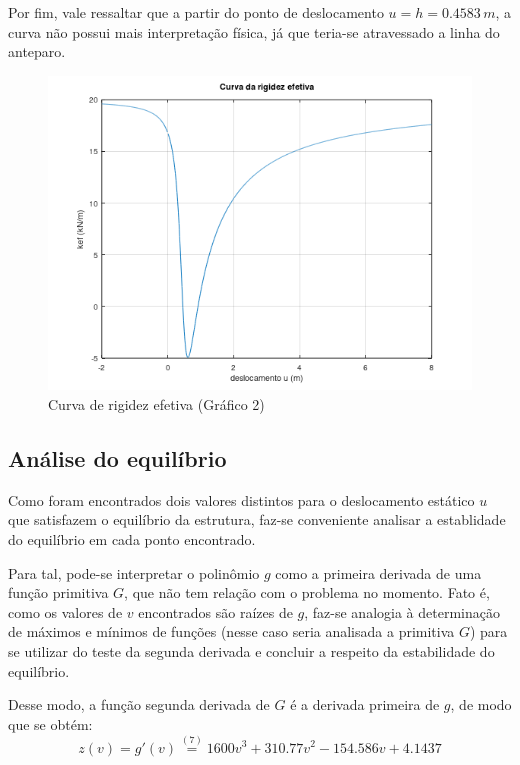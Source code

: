 \documentclass[a4paper, 12pt]{article}
\begin{document}
	Por fim, vale ressaltar que a partir do ponto de deslocamento $u=h=0.4583\,m$, a curva não possui mais interpretação
	física, já que teria-se atravessado a linha do anteparo.
	
	\begin{figure}[!htb]
		\centering
		\includegraphics[scale=1]{g2.png}
		\caption{Curva de rigidez efetiva (Gráfico 2)}
	\end{figure}
	
	\subsection{Análise do equilíbrio}
	
	Como foram encontrados dois valores distintos para o deslocamento estático $u$ que satisfazem o equilíbrio da estrutura, 
	faz-se conveniente analisar a establidade do equilíbrio em cada ponto encontrado. 
	
	Para tal, pode-se interpretar o 
	polinômio $g$ como a primeira derivada de uma função primitiva $G$, que não tem relação com o problema no momento. Fato é,
	como os valores de $v$ encontrados são raízes de $g$, faz-se analogia à determinação de máximos e mínimos de funções 
	(nesse caso seria analisada a primitiva $G$) para se utilizar do teste da segunda derivada e concluir a respeito da 
	estabilidade do equilíbrio.
	
	Desse modo, a função segunda derivada de $G$ é a derivada primeira de $g$, de modo que se obtém:
	$$z(v)=g'(v)\stackrel{(7)}{=}1600v^3+310.77v^2-154.586v+4.1437$$
	
	\newpage
	
\end{document}
